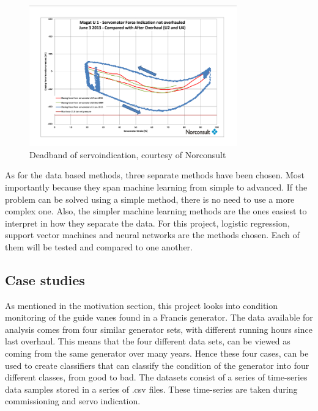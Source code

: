         \begin{figure}
            \centering
            \includegraphics[width=0.8\textwidth]{figures/introduction/deadband.png}
            \caption{Deadband of servoindication, courtesy of Norconsult}
            \label{fig:deadband}
        \end{figure}

        As for the data based methods, three separate methods have been chosen. Most importantly because they span machine learning from simple to advanced. If the problem can be solved using a simple method, there is no need to use a more complex one. Also, the simpler machine learning methods are the ones easiest to interpret in how they separate the data. For this project, logistic regression, support vector machines and neural networks are the methods chosen. Each of them will be tested and compared to one another. 
        
    \subsection{Case studies}   
        As mentioned in the motivation section, this project looks into condition monitoring of the guide vanes found in a Francis generator. The data available for analysis comes from four similar generator sets, with different running hours since last overhaul. This means that the four different data sets, can be viewed as coming from the same generator over many years. Hence these four cases, can be used to create classifiers that can classify the condition of the generator into four different classes, from good to bad. The datasets consist of a series of time-series data samples stored in a series of .csv files. These time-series are taken during commissioning and servo indication. %
        
